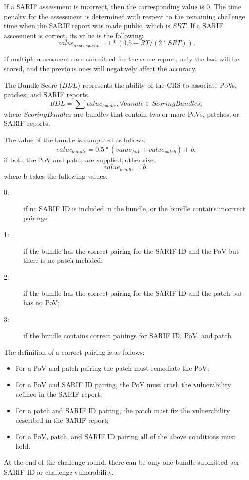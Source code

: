 If a SARIF assessment is incorrect, then the corresponding value is 0.
The time penalty for the assessment is determined with respect to the remaining challenge time when the SARIF report was made public, which is $SRT$.
If a SARIF assessment is correct, its value is the following:
\begin{equation}
value_{assessment} = 1 * (0.5 + RT/(2*SRT)).
\end{equation}

If multiple assessments are submitted for the same report, only the last will be scored, and the previous ones will negatively affect the accuracy.

The Bundle Score ($BDL$) represents the ability of the CRS to associate PoVs, patches, and SARIF reports.
\begin{equation}
BDL = \sum value_{bundle}, \forall bundle \in ScoringBundles,
\end{equation}
where $ScoringBundles$ are bundles that contain two or more PoVs, patches, or SARIF reports.

The value of the bundle is computed as follows:
\begin{equation}
value_{bundle} = 0.5 * (value_{PoV} + value_{patch}) + b,
\end{equation}
if both the PoV and patch are supplied; otherwise:
\begin{equation}
value_{bundle} = b,
\end{equation}
where b takes the following values:
\begin{description}
    \item[0:] if no SARIF ID is included in the bundle, or the bundle contains incorrect pairings;

    \item[1:] if the bundle has the correct pairing for the SARIF ID and the PoV but there is no patch included;

    \item[2:] if the bundle has the correct pairing for the SARIF ID and the patch but has no PoV;

    \item[3:] if the bundle contains correct pairings for SARIF ID, PoV, and patch.
\end{description}

The definition of a correct pairing is as follows:
\begin{itemize}
\item For a PoV and patch pairing the patch must remediate the PoV;
\item For a PoV and SARIF ID pairing, the PoV must crash the vulnerability defined in the SARIF report;
\item For a patch and SARIF ID pairing, the patch must fix the vulnerability described in the SARIF report;
\item For a PoV, patch, and SARIF ID pairing all of the above conditions must hold.
\end{itemize}
At the end of the challenge round, there can be only one bundle submitted per SARIF ID or challenge vulnerability.

